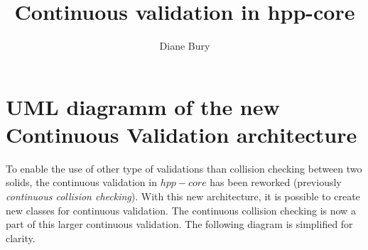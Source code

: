 \documentclass[10pt]{article}
\begin{document}
\title{Continuous validation in hpp-core}
\author{Diane Bury}
\maketitle

\section{UML diagramm of the new Continuous Validation architecture}

To enable the use of other type of validations than collision checking between two solids, the continuous validation in $hpp-core$ has been reworked (previously \textit{continuous collision checking}). With this new architecture, it is possible to create new classes for continuous validation. The continuous collision checking is now a part of this larger continuous validation. The following diagram is simplified for clarity.
\end{document}
